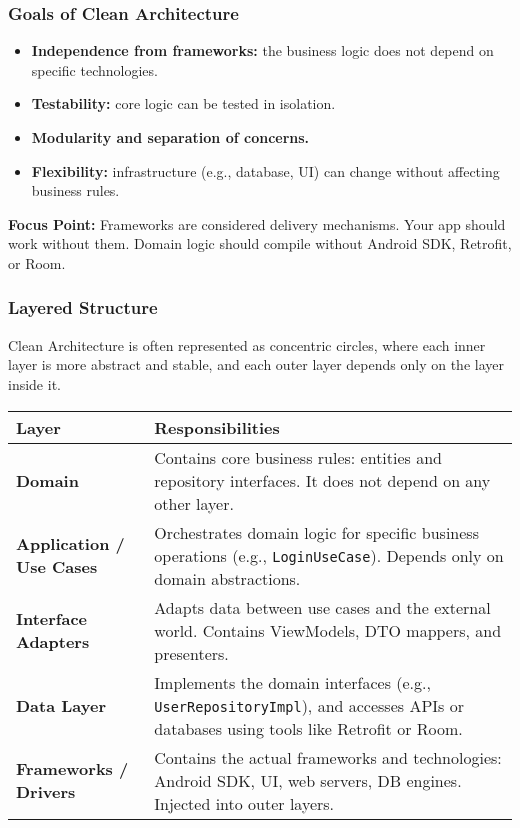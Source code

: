 \documentclass[a4paper,12pt]{article}
\begin{document}
\subsubsection{Goals of Clean Architecture}
\begin{itemize}
  \item \textbf{Independence from frameworks:} the business logic does not depend on specific technologies.
  \item \textbf{Testability:} core logic can be tested in isolation.
  \item \textbf{Modularity and separation of concerns.}
  \item \textbf{Flexibility:} infrastructure (e.g., database, UI) can change without affecting business rules.
\end{itemize}

\textbf{Focus Point:} Frameworks are considered delivery mechanisms. Your app should work without them. Domain logic should compile without Android SDK, Retrofit, or Room.

\subsubsection{Layered Structure}

Clean Architecture is often represented as concentric circles, where each inner layer is more abstract and stable, and each outer layer depends only on the layer inside it.

\begin{center}
\begin{tabular}{|l|p{9cm}|}
\hline
\textbf{Layer} & \textbf{Responsibilities} \\
\hline
\textbf{Domain} & 
Contains core business rules: entities and repository interfaces. It does not depend on any other layer. \\
\hline
\textbf{Application / Use Cases} & 
Orchestrates domain logic for specific business operations (e.g., \texttt{LoginUseCase}). Depends only on domain abstractions. \\
\hline
\textbf{Interface Adapters} & 
Adapts data between use cases and the external world. Contains ViewModels, DTO mappers, and presenters. \\
\hline
\textbf{Data Layer} & 
Implements the domain interfaces (e.g., \texttt{UserRepositoryImpl}), and accesses APIs or databases using tools like Retrofit or Room. \\
\hline
\textbf{Frameworks / Drivers} & 
Contains the actual frameworks and technologies: Android SDK, UI, web servers, DB engines. Injected into outer layers. \\
\hline
\end{tabular}
\end{center}
\end{document}
